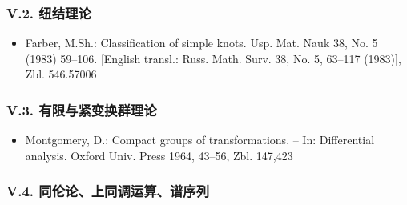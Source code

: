 \subsubsection*{V.2. 纽结理论}

\begin{itemize}
\item Farber, M.Sh.: Classification of simple knots. Usp. Mat. Nauk 38, No. 5 (1983) 59--106. [English transl.: Russ. Math. Surv. 38, No. 5, 63--117 (1983)], Zbl. 546.57006
\end{itemize}

\subsubsection*{V.3. 有限与紧变换群理论}

\begin{itemize}
\item Montgomery, D.: Compact groups of transformations. -- In: Differential analysis. Oxford Univ. Press 1964, 43--56, Zbl. 147,423
\end{itemize}

\subsubsection*{V.4. 同伦论、上同调运算、谱序列}

